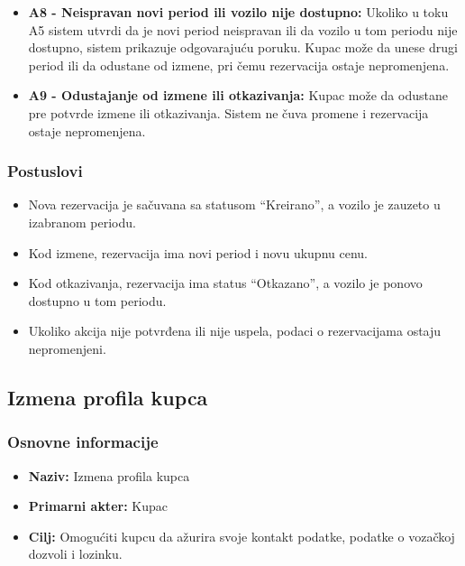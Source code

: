 \documentclass[a4paper,12pt]{article}
\begin{document}
\begin{itemize}
    \item \textbf{A8 - Neispravan novi period ili vozilo nije dostupno:}
    Ukoliko u toku A5 sistem utvrdi da je novi period neispravan ili da vozilo u tom periodu nije dostupno, sistem prikazuje odgovarajuću poruku. Kupac može da unese drugi period ili da odustane od izmene, pri čemu rezervacija ostaje nepromenjena.

    \item \textbf{A9 - Odustajanje od izmene ili otkazivanja:}
    Kupac može da odustane pre potvrde izmene ili otkazivanja. Sistem ne čuva promene i rezervacija ostaje nepromenjena.
\end{itemize}

\subsubsection{Postuslovi}

\begin{itemize}
    \item Nova rezervacija je sačuvana sa statusom \enquote{Kreirano}, a vozilo je zauzeto u izabranom periodu.
    \item Kod izmene, rezervacija ima novi period i novu ukupnu cenu.
    \item Kod otkazivanja, rezervacija ima status \enquote{Otkazano}, a vozilo je ponovo dostupno u tom periodu.
    \item Ukoliko akcija nije potvrđena ili nije uspela, podaci o rezervacijama ostaju nepromenjeni.
\end{itemize}

\newpage

\subsection{Izmena profila kupca}

\subsubsection{Osnovne informacije}

\begin{itemize}
    \item \textbf{Naziv:} Izmena profila kupca
    \item \textbf{Primarni akter:} Kupac
    \item \textbf{Cilj:} Omogućiti kupcu da ažurira svoje kontakt podatke, podatke o vozačkoj dozvoli i lozinku.
\end{itemize}
\end{document}
